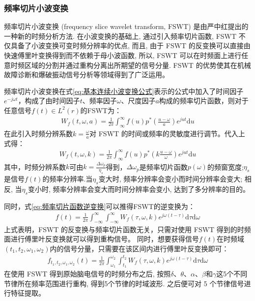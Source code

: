 \documentclass{ctexart}
\begin{document}
			\subsubsection{频率切片小波变换}
				频率切片小波变换 (frequency slice wavelet transform, FSWT) 是由严中红提出的一种新的时频分析方法. \cite{用于瞬态振动响应分析的频率切片小波变换}在小波变换的基础上, 通过引入频率切片函数, FSWT 不仅具备了小波变换可变时频分辨率的优点, 而且, 由于 FSWT 的反变换可以直接由快速傅里叶变换得到而不依赖于母小波函数, 所以, FSWT 可以在时频面上进行任意时频区域的分割并通过重构分离出所期望的信号分量. FSWT 的优势使其在机械故障诊断和爆破振动信号分析等领域得到了广泛运用。\par
				频率切片小波变换在式\ref{eq:基本连续小波变换公式}表示的公式中加入了时间因子$e^{-j\omega t}$，构成了由时间因子$t$、频率因子$\omega$、尺度因子$a$构成的频率切片函数，则对于任意信号$f(t)\in L^2(r)$的FSWT为：
				\begin{gather}
					W_f(t,\omega,a)=\frac{1}{2\pi}\int_{\infty}^{\infty}f(u)p^*({\frac{u-\omega}{a}})e^{jut}\mathrm{d}u
				\end{gather}
				在此引入时频分辨系数$k=\frac{\omega}{a}$对 FSWT 的时间或频率的灵敏度进行调节。代入上式得：
				\begin{gather}
					W_f(t,\omega,k)=\frac{1}{2\pi}\int_{\infty}^{\infty}f(u)p^*(k{\frac{u-\omega}{\omega}})e^{jut}\mathrm{d}u
				\end{gather}
				其中，时频分辨系数$k$可由$k=\frac{\Delta\omega_p}{\eta_s}$得到，$\Delta\omega_p$是频率切片函数$p(\omega)$的频窗宽度;$\eta_s$是信号$f(t)$的频率分辨率.当$\eta_s$变大时, 频率分辨率会变小而时间分辨率会变大; 相反, 当$\eta_s$变小时, 频率分辨率会变大而时间分辨率会变小, 达到了多分辨率的目的。\par
				同时，式\ref{eq:频率切片函数逆变换}可以推得FSWT的逆变换为：
				\begin{gather}
					f(t)=\frac{1}{2\pi}\int_{-\infty}^{\infty}\int_{-\infty}^{\infty}W_f(\tau,\omega,k)e^{j\omega(t-\tau)}\mathrm{d}\tau\mathrm{d}\omega
				\end{gather}
				上式表明，FSWT 的反变换与频率切片函数无关，只需对使用 FSWT 得到的时频面进行傅里叶反变换就可以得到重构信号。\cite{基于频率切片小波变换和支持向量机的癫痫脑电信号自动检测}
				同时，想要获得信号$f(t)$在时频域$(t_1,t_2,\omega_1,\omega_2)$内的信号分量，只需要在该区间内进行傅里叶反变换即可：
				\begin{gather}
					f_{t_1,t_2,\omega_1,\omega_2}(t)=\frac{1}{2\pi}\int_{\omega_1}^{\omega_2}\int_{t_1}^{t_2}W_f(\tau,\omega,k)e^{j\omega(t-\tau)}\mathrm{d}\tau\mathrm{d}\omega
				\end{gather}
				在使用 FSWT 得到原始脑电信号的时频分布之后, 按照$\delta$、$\theta$、$\alpha$、$\beta$和$\gamma$这5个不同节律所在频率范围进行重构, 得到5个节律的时域波形. 之后便可对 5 个节律信号进行特征提取。
\end{document}
